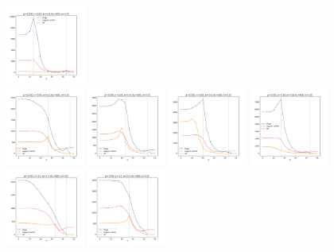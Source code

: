 \documentclass[a4paper]{article}
\begin{document}
\begin{figure}[H]
  \includegraphics[width=0.23\textwidth]{grid-g3-v2-w4_0}
  \\
  \includegraphics[width=0.23\textwidth]{grid-g3-v3-w1_0}
  \includegraphics[width=0.23\textwidth]{grid-g3-v3-w2_0}
  \includegraphics[width=0.23\textwidth]{grid-g3-v3-w3_0}
  \includegraphics[width=0.23\textwidth]{grid-g3-v3-w4_0}
  \\
  \includegraphics[width=0.23\textwidth]{grid-g3-v4-w1_0}
  \includegraphics[width=0.23\textwidth]{grid-g3-v4-w2_0}

\end{figure}
\end{document}
